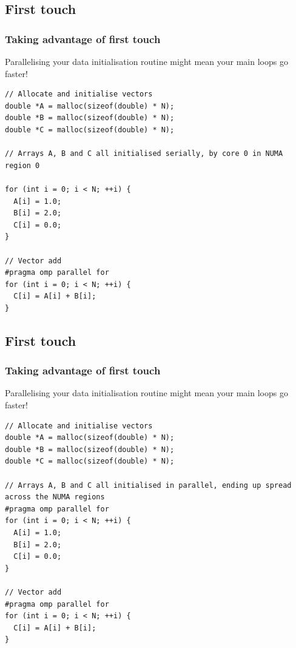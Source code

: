 \documentclass[aspectratio=169]{beamer}
\begin{document}
\subsection{First touch}
\begin{frame}[fragile]
\frametitle{Taking advantage of first touch}
Parallelising your data initialisation routine might mean your main loops go faster!


\begin{verbatim}
// Allocate and initialise vectors
double *A = malloc(sizeof(double) * N);
double *B = malloc(sizeof(double) * N);
double *C = malloc(sizeof(double) * N);

// Arrays A, B and C all initialised serially, by core 0 in NUMA region 0

for (int i = 0; i < N; ++i) {
  A[i] = 1.0;
  B[i] = 2.0;
  C[i] = 0.0;
}

// Vector add
#pragma omp parallel for
for (int i = 0; i < N; ++i) {
  C[i] = A[i] + B[i];
}
\end{verbatim}

\end{frame}

\subsection{First touch}
\begin{frame}[fragile]
\frametitle{Taking advantage of first touch}
Parallelising your data initialisation routine might mean your main loops go faster!


\begin{verbatim}
// Allocate and initialise vectors
double *A = malloc(sizeof(double) * N);
double *B = malloc(sizeof(double) * N);
double *C = malloc(sizeof(double) * N);

// Arrays A, B and C all initialised in parallel, ending up spread across the NUMA regions
#pragma omp parallel for
for (int i = 0; i < N; ++i) {
  A[i] = 1.0;
  B[i] = 2.0;
  C[i] = 0.0;
}

// Vector add
#pragma omp parallel for
for (int i = 0; i < N; ++i) {
  C[i] = A[i] + B[i];
}
\end{verbatim}

\end{frame}
\end{document}
